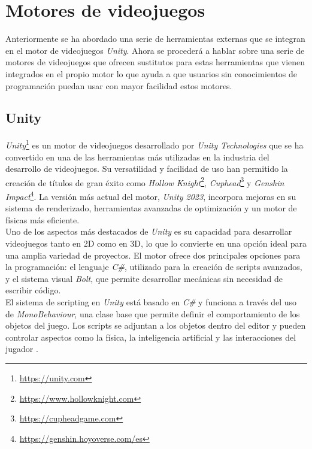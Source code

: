 \section{Motores de videojuegos}

Anteriormente se ha abordado una serie de herramientas externas que se integran en el motor de videojuegos \textit{Unity}. Ahora se procederá a hablar sobre una serie de motores de videojuegos que ofrecen sustitutos para estas herramientas que vienen integrados en el propio motor lo que ayuda a que usuarios sin conocimientos de programación puedan usar con mayor facilidad estos motores.

\subsection{Unity}
\textit{Unity}\footnote{\url{https://unity.com}} es un motor de videojuegos desarrollado por \textit{Unity Technologies} que se ha convertido en una de las herramientas más utilizadas en la industria del desarrollo de videojuegos. Su versatilidad y facilidad de uso han permitido la creación de títulos de gran éxito como \textit{Hollow Knight}\footnote{\url{https://www.hollowknight.com}}, \textit{Cuphead}\footnote{\url{https://cupheadgame.com}} y \textit{Genshin Impact}\footnote{\url{https://genshin.hoyoverse.com/es}}. La versión más actual del motor, \textit{Unity 2023}, incorpora mejoras en su sistema de renderizado, herramientas avanzadas de optimización y un motor de físicas más eficiente.\\

Uno de los aspectos más destacados de \textit{Unity} es su capacidad para desarrollar videojuegos tanto en 2D como en 3D, lo que lo convierte en una opción ideal para una amplia variedad de proyectos. El motor ofrece dos principales opciones para la programación: el lenguaje \textit{C\#}, utilizado para la creación de scripts avanzados, y el sistema visual \textit{Bolt}, que permite desarrollar mecánicas sin necesidad de escribir código.\\

El sistema de scripting en \textit{Unity} está basado en \textit{C\#} y funciona a través del uso de \textit{MonoBehaviour}, una clase base que permite definir el comportamiento de los objetos del juego. Los scripts se adjuntan a los objetos dentro del editor y pueden controlar aspectos como la física, la inteligencia artificial y las interacciones del jugador .\\


